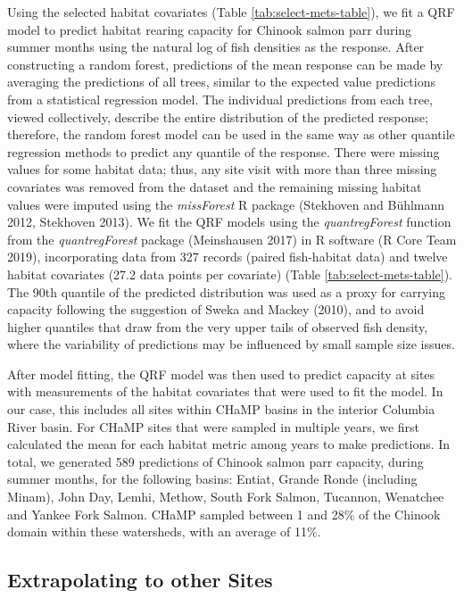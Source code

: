 \documentclass[
  12pt,
]{article}
\begin{document}
Using the selected habitat covariates (Table \ref{tab:select-mets-table}), we fit a QRF model to predict habitat rearing capacity for Chinook salmon parr during summer months using the natural log of fish densities as the response. After constructing a random forest, predictions of the mean response can be made by averaging the predictions of all trees, similar to the expected value predictions from a statistical regression model. The individual predictions from each tree, viewed collectively, describe the entire distribution of the predicted response; therefore, the random forest model can be used in the same way as other quantile regression methods to predict any quantile of the response. There were missing values for some habitat data; thus, any site visit with more than three missing covariates was removed from the dataset and the remaining missing habitat values were imputed using the \emph{missForest} R package (Stekhoven and Bühlmann 2012, Stekhoven 2013). We fit the QRF models using the \emph{quantregForest} function from the \emph{quantregForest} package (Meinshausen 2017) in R software (R Core Team 2019), incorporating data from 327 records (paired fish-habitat data) and twelve habitat covariates (27.2 data points per covariate) (Table \ref{tab:select-mets-table}). The 90th quantile of the predicted distribution was used as a proxy for carrying capacity following the suggestion of Sweka and Mackey (2010), and to avoid higher quantiles that draw from the very upper tails of observed fish density, where the variability of predictions may be influenced by small sample size issues.

After model fitting, the QRF model was then used to predict capacity at sites with measurements of the habitat covariates that were used to fit the model. In our case, this includes all sites within CHaMP basins in the interior Columbia River basin. For CHaMP sites that were sampled in multiple years, we first calculated the mean for each habitat metric among years to make predictions. In total, we generated 589 predictions of Chinook salmon parr capacity, during summer months, for the following basins: Entiat, Grande Ronde (including Minam), John Day, Lemhi, Methow, South Fork Salmon, Tucannon, Wenatchee and Yankee Fork Salmon. CHaMP sampled between 1 and 28\% of the Chinook domain within these watersheds, with an average of 11\%.

\hypertarget{extrapolating-to-other-sites}{%
\subsection{Extrapolating to other Sites}\label{extrapolating-to-other-sites}}
\end{document}
